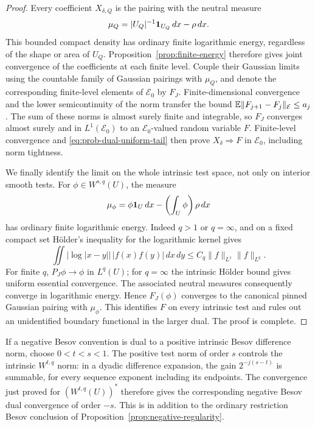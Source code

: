 \begin{proof}
Every coefficient \(X_{\delta,Q}\) is the pairing with the neutral
measure
\[
 \mu_Q=|U_Q|^{-1}\mathbf1_{U_Q}\,dx-\rho\,dx.
\]
This bounded compact density has ordinary finite logarithmic energy,
regardless of the shape or area of \(U_Q\). Proposition~\ref{prop:finite-energy}
therefore gives joint convergence of the coefficients at each finite
level. Couple their Gaussian limits using the countable family of
Gaussian pairings with \(\mu_Q\), and denote the corresponding
finite-level elements of \(\mathcal E_0\) by \(F_J\).
Finite-dimensional convergence and the lower semicontinuity of the norm
transfer the bound
\(\mathbb E\|F_{j+1}-F_j\|_{\mathcal E}\le a_j\).
The sum of these norms is almost surely finite and integrable, so
\(F_J\) converges almost surely and in \(L^1(\mathcal E_0)\) to
an \(\mathcal E_0\)-valued random variable \(F\).
Finite-level convergence and \eqref{eq:prob-dual-uniform-tail}
then prove \(X_\delta\Rightarrow F\) in \(\mathcal E_0\), including
norm tightness.

We finally identify the limit on the whole intrinsic test space, not
only on interior smooth tests. For \(\phi\in W^{s,q}(U)\), the measure
\[
 \mu_\phi=\phi\mathbf1_U\,dx-\left(\int_U\phi\right)\rho\,dx
\]
has ordinary finite logarithmic energy. Indeed \(q>1\) or \(q=\infty\),
and on a fixed compact set Hölder's inequality for the logarithmic
kernel gives
\[
 \iint |\log|x-y||\,|f(x)f(y)|\,dx\,dy
       \le C_q\|f\|_{L^1}\|f\|_{L^q}.
\]
For finite \(q\), \(P_J\phi\to\phi\) in \(L^q(U)\); for \(q=\infty\)
the intrinsic Hölder bound gives uniform essential convergence.
The associated neutral measures consequently converge in logarithmic
energy. Hence \(F_J(\phi)\) converges to the canonical pinned Gaussian
pairing with \(\mu_\phi\). This identifies \(F\) on every intrinsic
test and rules out an unidentified boundary functional in the larger
dual. The proof is complete.
\end{proof}

\begin{remark}
If a negative Besov convention is dual to a positive intrinsic Besov
difference norm, choose \(0<t<s<1\). The positive test norm of order
\(s\) controls the intrinsic \(W^{t,q}\) norm: in a dyadic difference
expansion, the gain \(2^{-j(s-t)}\) is summable, for every sequence
exponent including its endpoints. The convergence just proved for
\((W^{t,q}(U))^*\) therefore gives the corresponding negative Besov
dual convergence of order \(-s\). This is in addition to the ordinary
restriction Besov conclusion of Proposition~\ref{prop:negative-regularity}.
\end{remark}

